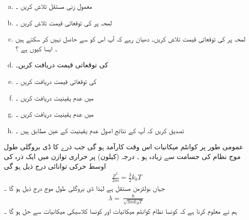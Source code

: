 \begin{enumerate}[a.]
\item
معمول زنی مستقل   تلاش کریں ۔ 
\item
 لمحہ    پر     کی توقعاتی قیمت تلاش کریں ۔
\item
 لمحہ   پر    کی توقعاتی قیمت تلاش کریں۔  دھیان رہے  کہ  آپ اس کو      سے حاصل نہیں کر سکتے ہیں ۔ ایسا کیوں ہے ؟
\item
{} کی توقعاتی قیمت دریافت کریں۔ 
\item
{}  کی توقعاتی قیمت دریافت کریں ۔  
\item
{}  میں   عدم یقینیت  دریافت کریں ۔ 
\item
{} میں عدم یقینیت دریافت کریں ۔
\item
 تصدیق کریں کہ آپ کے نتائج اصول عدم یقینیت  کے عین مطابق ہیں ۔
\end{enumerate}
عمومی طور پر کوانٹم میکانیات اس وقت کارآمد   ہو گی  جب   ذرے  کا  ڈی بروگلی طول موج   نظام کی  جسامت  سے زیادہ ہو ۔ درجہ     (کیلون)   پر حراری توازن میں ایک   ذرہ  کی اوسط حرکی توانائی درج ذیل ہو گی 
\begin{align*}
\frac{ p^2 }{ 2 m } =  \frac{ 3 }{ 2 } k_b T
\end{align*}
جہاں    بولٹزمن مستقل ہے   لہٰذا  ڈی بروگلی طول  موج درج ذیل ہو گا ۔
\begin{align*}
\lambda = \frac{ \hslash }{ \sqrt{ 3 m k_B T } }
\end{align*}
ہم نے معلوم کرنا ہے کہ کونسا نظام کوانٹم میکانیات  اور کونسا  کلاسیکی میکانیات  سے حل ہو گا  ۔ 
